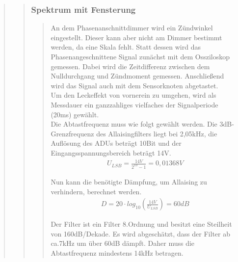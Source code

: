 \begin{quote}
\begin{quote}
		\subsubsection{Spektrum mit Fensterung}
		\begin{quote}
            An dem Phasenanschnittdimmer wird ein Zündwinkel eingestellt. Dieser kann aber nicht am Dimmer bestimmt
            werden, da eine Skala fehlt. Statt dessen wird das Phasenangeschnittene Signal zunächst mit dem Ossziloskop
            gemessen.
            Dabei wird die Zeitdifferenz zwischen dem Nulldurchgang und Zündmoment gemessen. Anschließend wird das
            Signal auch mit dem Sensorknoten abgetastet.\\
            Um den Leckeffekt von vornerein zu umgehen, wird als Messdauer ein ganzzahliges vielfaches der Signalperiode
            (20ms) gewählt.\\
            Die Abtastfrequenz muss wie folgt gewählt werden.
            Die 3dB-Grenzfrequenz des Allaisingfilters liegt bei 2,05kHz, die Auflösung des ADUs beträgt 10Bit und der
            Eingangsspannungsbereich beträgt 14V.\\
            
            \begin{align}
                U_{LSB} = \frac{14V}{2^{10}-1} = 0,01368V 
            \end{align} 
		
		    Nun kann die benötigte Dämpfung, um Allaising zu verhindern, berechnet werden.\\
		
            \begin{align}
                D = 20 \cdot log_{10}(\frac{14V}{U_{LSB}}) = 60dB
            \end{align} 
		
            Der Filter ist ein Filter 8.Ordnung und besitzt eine Steilheit von 160dB/Dekade. Es wird abgeschätzt, dass
            der Filter ab ca.7kHz um über 60dB dämpft. Daher muss die Abtastfrequenz mindestens 14kHz betragen.

    		
		

\end{quote}
\end{quote}
\end{quote}
